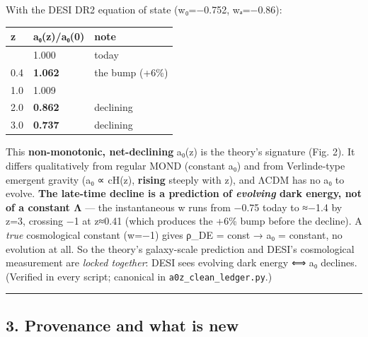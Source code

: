 \documentclass[
]{article}
\newcounter{none} %
\begin{document}
With the DESI DR2 equation of state (w₀=−0.752, wₐ=−0.86):

{\def\LTcaptype{none} %
\begin{longtable}[]{@{}lll@{}}
\toprule\noalign{}
z & a₀(z)/a₀(0) & note \\
\midrule\noalign{}
\endhead
\bottomrule\noalign{}
\endlastfoot
0.0 & 1.000 & today \\
0.4 & \textbf{1.062} & the bump (+6\%) \\
1.0 & 1.009 & \\
2.0 & \textbf{0.862} & declining \\
3.0 & \textbf{0.737} & declining \\
\end{longtable}
}

This \textbf{non-monotonic, net-declining} a₀(z) is the theory's
signature (Fig. 2). It differs qualitatively from regular MOND (constant
a₀) and from Verlinde-type emergent gravity (a₀ ∝ cH(z), \textbf{rising}
steeply with z), and ΛCDM has no a₀ to evolve. \textbf{The late-time
decline is a prediction of \emph{evolving} dark energy, not of a
constant Λ} --- the instantaneous w runs from −0.75 today to ≈−1.4 by
z=3, crossing −1 at z≈0.41 (which produces the +6\% bump before the
decline). A \emph{true} cosmological constant (w=−1) gives ρ\_DE = const
→ a₀ = constant, no evolution at all. So the theory's galaxy-scale
prediction and DESI's cosmological measurement are \emph{locked
together}: DESI sees evolving dark energy ⟺ a₀ declines. (Verified in
every script; canonical in \texttt{a0z\_clean\_ledger.py}.)

\begin{center}\rule{0.5\linewidth}{0.5pt}\end{center}

\subsection{3. Provenance and what is
new}\label{provenance-and-what-is-new}
\end{document}
